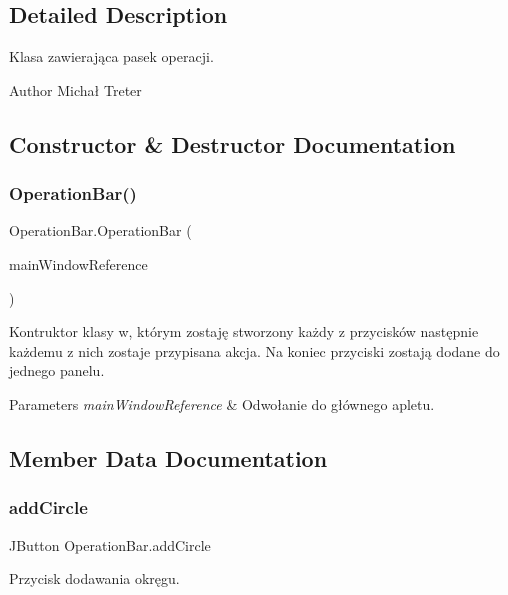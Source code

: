 \subsection{Detailed Description}
Klasa zawierająca pasek operacji. \begin{DoxyAuthor}{Author}
Michał Treter 
\end{DoxyAuthor}


\subsection{Constructor \& Destructor Documentation}
\mbox{\label{class_operation_bar_a00afa9dcb2820a68ccfce0071c34a4b2}} 
\subsubsection{Operation\+Bar()}
{\footnotesize\ttfamily Operation\+Bar.\+Operation\+Bar (\begin{DoxyParamCaption}\item[{\textbf{ Geo\+GraphicX}}]{main\+Window\+Reference }\end{DoxyParamCaption})}

Kontruktor klasy w, którym zostaję stworzony każdy z przycisków następnie każdemu z nich zostaje przypisana akcja. Na koniec przyciski zostają dodane do jednego panelu. 
\begin{DoxyParams}{Parameters}
{\em main\+Window\+Reference} & Odwołanie do głównego apletu. \\
\hline
\end{DoxyParams}


\subsection{Member Data Documentation}
\mbox{\label{class_operation_bar_a367705a6fa8dfdf841bccd5034a69653}} 
\subsubsection{add\+Circle}
{\footnotesize\ttfamily J\+Button Operation\+Bar.\+add\+Circle}

Przycisk dodawania okręgu. \mbox{\label{class_operation_bar_a4ac995bc8e8fa0d196b856847b158a2b}} 
